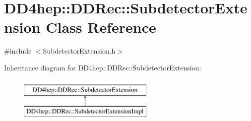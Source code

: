 \hypertarget{class_d_d4hep_1_1_d_d_rec_1_1_subdetector_extension}{}\section{D\+D4hep\+:\+:D\+D\+Rec\+:\+:Subdetector\+Extension Class Reference}
\label{class_d_d4hep_1_1_d_d_rec_1_1_subdetector_extension}


{\ttfamily \#include $<$Subdetector\+Extension.\+h$>$}

Inheritance diagram for D\+D4hep\+:\+:D\+D\+Rec\+:\+:Subdetector\+Extension\+:\begin{figure}[H]
\begin{center}
\leavevmode
\includegraphics[height=2.000000cm]{class_d_d4hep_1_1_d_d_rec_1_1_subdetector_extension}
\end{center}
\end{figure}
